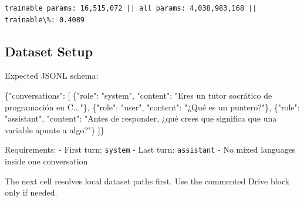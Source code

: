 \documentclass[11pt]{article}
\newenvironment{Shaded}{}{}
\newcommand{\DataTypeTok}[1]{\textcolor[rgb]{0.56,0.13,0.00}{{#1}}}
\newcommand{\StringTok}[1]{\textcolor[rgb]{0.25,0.44,0.63}{{#1}}}
\newcommand{\OtherTok}[1]{\textcolor[rgb]{0.00,0.44,0.13}{{#1}}}
\newcommand{\FunctionTok}[1]{\textcolor[rgb]{0.02,0.16,0.49}{{#1}}}
\renewcommand{\StringTok}[1]{\textcolor{codestring}{{#1}}}
\renewcommand{\FunctionTok}[1]{\textcolor{codefunction}{{#1}}}
\begin{document}
    \begin{Verbatim}[commandchars=\\\{\}]
trainable params: 16,515,072 || all params: 4,038,983,168 || trainable\%: 0.4089
    \end{Verbatim}

    \subsection{Dataset Setup}\label{dataset-setup}

Expected JSONL schema:

\begin{Shaded}
\begin{Highlighting}[]
\FunctionTok{\{}\DataTypeTok{"conversations"}\FunctionTok{:} \OtherTok{[}
  \FunctionTok{\{}\DataTypeTok{"role"}\FunctionTok{:} \StringTok{"system"}\FunctionTok{,} \DataTypeTok{"content"}\FunctionTok{:} \StringTok{"Eres un tutor socrático de programación en C..."}\FunctionTok{\}}\OtherTok{,}
  \FunctionTok{\{}\DataTypeTok{"role"}\FunctionTok{:} \StringTok{"user"}\FunctionTok{,} \DataTypeTok{"content"}\FunctionTok{:} \StringTok{"¿Qué es un puntero?"}\FunctionTok{\}}\OtherTok{,}
  \FunctionTok{\{}\DataTypeTok{"role"}\FunctionTok{:} \StringTok{"assistant"}\FunctionTok{,} \DataTypeTok{"content"}\FunctionTok{:} \StringTok{"Antes de responder, ¿qué crees que significa que una variable \textquotesingle{}apunte\textquotesingle{} a algo?"}\FunctionTok{\}}
\OtherTok{]}\FunctionTok{\}}
\end{Highlighting}
\end{Shaded}

Requirements: - First turn: \texttt{system} - Last turn:
\texttt{assistant} - No mixed languages inside one conversation

The next cell resolves local dataset paths first. Use the commented
Drive block only if needed.
\end{document}

